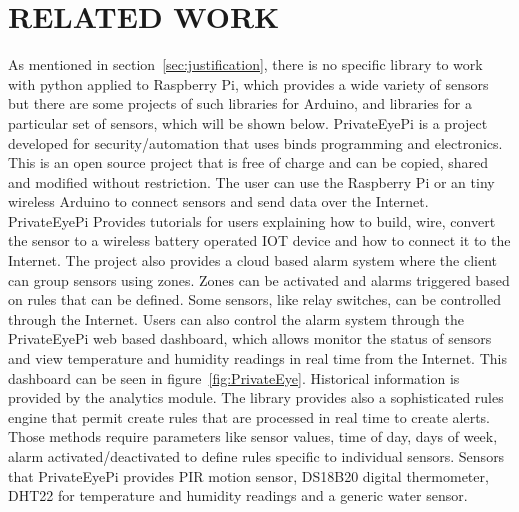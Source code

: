 \documentclass{acm_proc_article-sp}
\begin{document}
\section{RELATED WORK}
As mentioned in section~\ref{sec:justification}, there is no specific library to work with python applied to Raspberry Pi, which provides a wide variety of sensors but there are some projects of such libraries for Arduino, and libraries for a particular set of sensors, which will be shown below.
\newline
\newline
PrivateEyePi\cite{Privateeyepi} is a project developed for security/automation that uses binds programming and electronics.
This is an open source project that is free of charge and can be copied, shared and modified without restriction.
The user can use the Raspberry Pi or an tiny wireless Arduino to connect sensors and send data over the Internet.
\newline
\newline
PrivateEyePi Provides tutorials for users explaining how to build, wire, convert the sensor to a wireless battery operated IOT device and how to connect it to the Internet. The project also provides a cloud based alarm system where the client can group sensors using zones. Zones can be activated and alarms triggered based on rules that can be defined.
\newline
\newline
Some sensors, like relay switches, can be controlled through the Internet. Users can also control the alarm system through the PrivateEyePi web based dashboard, which allows monitor the status of sensors and view temperature and humidity readings in real time from the Internet. This dashboard can be seen in figure~\ref{fig:PrivateEye}.
\newline
\newline
 Historical information is provided by the analytics module. The library provides also a sophisticated rules engine that permit create rules that are processed in real time to create alerts. Those methods require parameters like sensor values, time of day, days of week, alarm activated/deactivated to define rules specific to individual sensors.     
Sensors that PrivateEyePi provides PIR motion sensor, DS18B20 digital thermometer, DHT22 for temperature and humidity readings and a generic water sensor.
\end{document}

